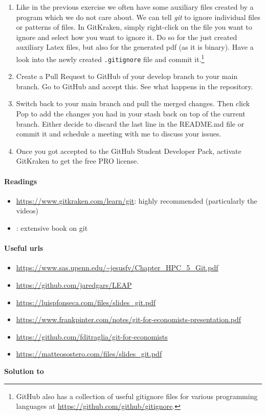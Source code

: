 \begin{enumerate}
\item
Like in the previous exercise we often have some auxiliary files created by a program which we do not care about.
We can tell \emph{git} to ignore individual files or patterns of files.
In GitKraken, simply right-click on the file you want to ignore and select how you want to ignore it.
Do so for the just created auxiliary Latex files, but also for the generated pdf (as it is binary).
Have a look into the newly created \texttt{.gitignore} file and commit it.\footnote{%
  GitHub also has a collection of useful gitignore files for various programming languages at \url{https://github.com/github/gitignore}.
}

\item
Create a Pull Request to GitHub of your develop branch to your main branch. Go to GitHub and accept this.
See what happens in the repository.

\item
Switch back to your main branch and pull the merged changes.
Then click Pop to add the changes you had in your stash back on top of the current branch.
Either decide to discard the last line in the README.md file or commit it and schedule a meeting with me to discuss your issues.

\item
Once you got accepted to the GitHub Student Developer Pack, activate GitKraken to get the free PRO license.

\end{enumerate}


\paragraph{Readings}
\begin{itemize}
	\item \url{https://www.gitkraken.com/learn/git}: highly recommended (particularly the videos)
	\item \textcite{Chacon_2014_ProGit}: extensive book on git
\end{itemize}

\paragraph{Useful urls}
\begin{itemize}	
	\item \url{https://www.sas.upenn.edu/~jesusfv/Chapter_HPC_5_Git.pdf}
	\item \url{https://github.com/jaredgars/LEAP}
	\item \url{https://luispfonseca.com/files/slides_git.pdf}
	\item \url{https://www.frankpinter.com/notes/git-for-economists-presentation.pdf}
	\item \url{https://github.com/fditraglia/git-for-economists}
	\item \url{https://matteosostero.com/files/slides_git.pdf}
\end{itemize}

\begin{solution}\textbf{Solution to }
\ifDisplaySolutions%

\fi
\newpage
\end{solution}